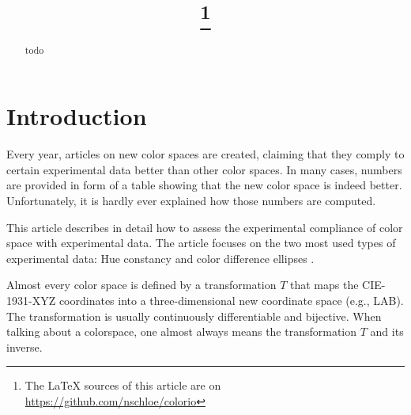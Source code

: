 \documentclass{scrartcl}
\title{\mytitle\footnote{The LaTeX sources of this article are on
\url{https://github.com/nschloe/colorio}}}
\author{\myauthor}
\theoremstyle{named}
\begin{document}
\maketitle
\begin{abstract}
  todo
\end{abstract}

\section{Introduction}

Every year, articles on new color spaces are created, claiming that they comply to
certain experimental data better than other color spaces. In many cases, numbers are
provided in form of a table showing that the new color space is indeed better.
Unfortunately, it is hardly ever explained how those numbers are computed.

This article describes in detail how to assess the experimental compliance of color
space with experimental data. The article focuses on the two most used types of
experimental data: Hue constancy \cite{ebner,xiao,hung} and color difference ellipses
\cite{macadam,luo}.

Almost every color space is defined by a transformation $T$ that maps the CIE-1931-XYZ
coordinates into a three-dimensional new coordinate space (e.g., LAB). The
transformation is usually continuously differentiable and bijective. When talking about
a colorspace, one almost always means the transformation $T$ and its inverse.
\end{document}
